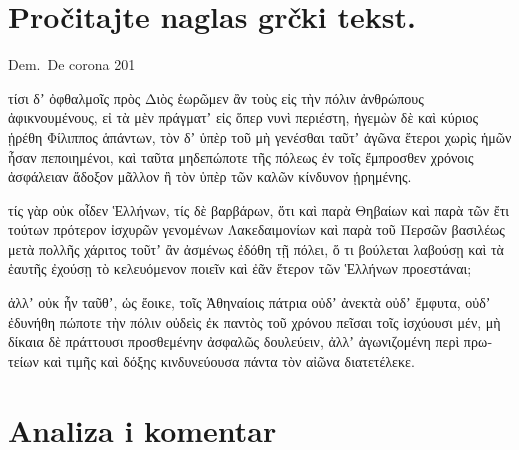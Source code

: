 
\section*{Pročitajte naglas grčki tekst.}

Dem.\ De corona 201


\medskip


{\large

\begin{greek}

\noindent τίσι δʼ ὀφθαλμοῖς πρὸς Διὸς ἑωρῶμεν ἂν τοὺς εἰς τὴν πόλιν ἀνθρώπους ἀφικνουμένους, εἰ τὰ μὲν πράγματʼ εἰς ὅπερ νυνὶ περιέστη, ἡγεμὼν δὲ καὶ κύριος ᾑρέθη Φίλιππος ἁπάντων, τὸν δʼ ὑπὲρ τοῦ μὴ γενέσθαι ταῦτʼ ἀγῶνα ἕτεροι χωρὶς ἡμῶν ἦσαν πεποιημένοι, καὶ ταῦτα μηδεπώποτε τῆς πόλεως ἐν τοῖς ἔμπροσθεν χρόνοις ἀσφάλειαν ἄδοξον μᾶλλον ἢ τὸν ὑπὲρ τῶν καλῶν κίνδυνον ᾑρημένης.

τίς γὰρ οὐκ οἶδεν Ἑλλήνων, τίς δὲ βαρβάρων, ὅτι καὶ παρὰ Θηβαίων καὶ παρὰ τῶν ἔτι τούτων πρότερον ἰσχυρῶν γενομένων Λακεδαιμονίων καὶ παρὰ τοῦ Περσῶν βασιλέως μετὰ πολλῆς χάριτος τοῦτʼ ἂν ἀσμένως ἐδόθη τῇ πόλει, ὅ τι βούλεται λαβούσῃ καὶ τὰ ἑαυτῆς ἐχούσῃ τὸ κελευόμενον ποιεῖν καὶ ἐᾶν ἕτερον τῶν Ἑλλήνων προεστάναι;

ἀλλʼ οὐκ ἦν ταῦθʼ, ὡς ἔοικε, τοῖς Ἀθηναίοις πάτρια οὐδʼ ἀνεκτὰ οὐδʼ ἔμφυτα, οὐδʼ ἐδυνήθη πώποτε τὴν πόλιν οὐδεὶς ἐκ παντὸς τοῦ χρόνου πεῖσαι τοῖς ἰσχύουσι μέν, μὴ δίκαια δὲ πράττουσι προσθεμένην ἀσφαλῶς δουλεύειν, ἀλλʼ ἀγωνιζομένη περὶ πρωτείων καὶ τιμῆς καὶ δόξης κινδυνεύουσα πάντα τὸν αἰῶνα διατετέλεκε.

\end{greek}

}


\section*{Analiza i komentar}


